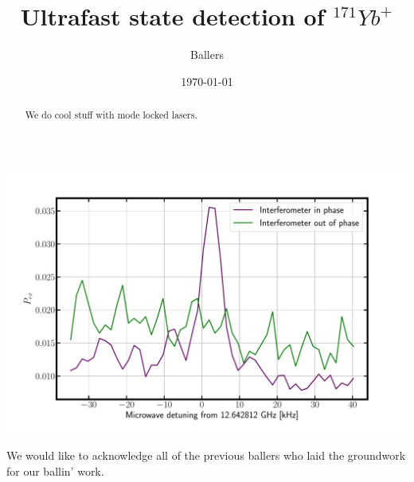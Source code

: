 \documentclass[preprint,superscriptaddress,amsmath,amssymb,aps,prl]{revtex4-1}
\begin{document}
 
\title{Ultrafast state detection of $^{171}Yb^+$}

\author{Ballers}



\date{\today}

\begin{abstract}
  We do cool stuff with mode locked lasers. 
\end{abstract}

\maketitle

\includegraphics[scale = 0.5]{single_ion_uW_linescan_ML.pdf}

\begin{acknowledgments}
  We would like to acknowledge all of the previous ballers who laid the groundwork for our ballin' work. 
\end{acknowledgments}


\end{document}
